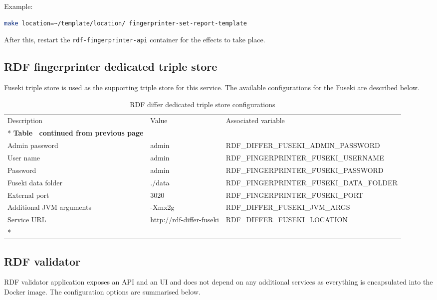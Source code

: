 		Example:
		\begin{lstlisting}[language=bash]
make location=~/template/location/ fingerprinter-set-report-template
		\end{lstlisting}

		After this, restart the \texttt{rdf-fingerprinter-api} container for the effects to take place.


	\subsection{RDF fingerprinter dedicated triple store}
	
	Fuseki triple store is used as the supporting triple store for this service.
	The available configurations for the Fuseki are described below. 
	
	
	\begin{longtable}[c]{@{}p{4cm}p{2.5cm}l@{}}
		\toprule
		Description & Value & Associated variable \\* \midrule
		\endfirsthead
		\multicolumn{3}{c}%
		{{\bfseries Table \thetable\ continued from previous page}} \\
		\endhead
		\bottomrule
		\endfoot
		\endlastfoot
		Admin password & admin & \footnotesize RDF\_DIFFER\_FUSEKI\_ADMIN\_PASSWORD \\
		User name & admin & \footnotesize RDF\_FINGERPRINTER\_FUSEKI\_USERNAME \\
		Password & admin & \footnotesize RDF\_FINGERPRINTER\_FUSEKI\_PASSWORD \\
		Fuseki data folder & ./data & \footnotesize RDF\_FINGERPRINTER\_FUSEKI\_DATA\_FOLDER \\
		External port & 3020 & \footnotesize RDF\_FINGERPRINTER\_FUSEKI\_PORT \\
		Additional JVM arguments & -Xmx2g & \footnotesize RDF\_DIFFER\_FUSEKI\_JVM\_ARGS \\
		Service URL & http://rdf-differ-fuseki & \footnotesize RDF\_DIFFER\_FUSEKI\_LOCATION \\* \bottomrule
		\caption{RDF differ dedicated triple store configurations}
		\label{tab:my-table8}\\
	\end{longtable}

	
	\subsection{RDF validator}
	
	RDF validator application exposes an API and an UI and does not depend on any additional services as everything is encapsulated into the Docker image. The configuration options are summarised below. 
	
